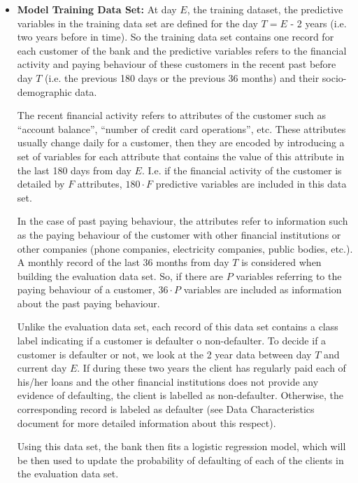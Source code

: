 \begin{itemize}

\item \textbf{Model Training Data Set:}  At day $E$, the training dataset, the predictive variables in the training data set are defined for the day $T = E$ - 2 years (i.e. two years before in time). So the training data set contains one record for each customer of the bank and the predictive variables refers to the financial activity and paying behaviour of these customers in the recent past before day $T$ (i.e. the previous 180 days or the previous 36 months) and their socio-demographic data. 

The recent financial activity refers to attributes of the customer such as ``account balance'', ``number of credit card operations'', etc. These attributes usually change daily for a customer, then they are encoded by introducing a set of variables for each attribute that contains the value of this attribute in the last 180 days from day $E$. I.e. if the financial activity of the customer is detailed by $F$ attributes,  $180\cdot F$ predictive variables are included in this data set.

In the case of past paying behaviour, the attributes refer to information such as the paying behaviour of the customer with other financial institutions or other companies (phone companies, electricity companies, public bodies, etc.). A monthly record of the last 36 months from day $T$ is considered when building the evaluation data set. So, if there are $P$ variables referring to the paying behaviour of a customer, $36\cdot P$ variables are included as information about the past paying behaviour.  

Unlike the evaluation data set, each record of this data set contains a class label indicating if a customer is defaulter o non-defaulter. To decide if a customer is defaulter or not, we look at the 2 year data between day $T$ and current day $E$. If during these two years the client has regularly paid each of his/her loans and the other financial institutions does not provide any evidence of defaulting, the client is labelled as non-defaulter. Otherwise, the corresponding record is labeled as defaulter (see Data Characteristics document for more detailed information about this respect).   

Using this data set, the bank then fits a logistic regression model, which will be then used to update the probability of defaulting of each of the clients in the evaluation data set.  


\end{itemize}

